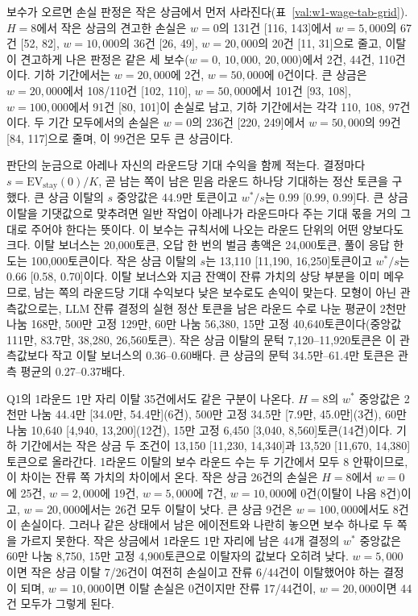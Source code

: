 보수가 오르면 손실 판정은 작은 상금에서 먼저 사라진다(표~\ref{val:w1-wage-tab-grid}). $H=8$에서 작은 상금의 견고한 손실은 $w=0$의 131건 [116, 143]에서 $w=5{,}000$의 67건 [52, 82], $w=10{,}000$의 36건 [26, 49], $w=20{,}000$의 20건 [11, 31]으로 줄고, 이탈이 견고하게 나은 판정은 같은 세 보수($w=0$, $10{,}000$, $20{,}000$)에서 2건, 44건, 110건이다. 기하 기간에서는 $w=20{,}000$에 2건, $w=50{,}000$에 0건이다. 큰 상금은 $w=20{,}000$에서 108/110건 [102, 110], $w=50{,}000$에서 101건 [93, 108], $w=100{,}000$에서 91건 [80, 101]이 손실로 남고, 기하 기간에서는 각각 110, 108, 97건이다. 두 기간 모두에서의 손실은 $w=0$의 236건 [220, 249]에서 $w=50{,}000$의 99건 [84, 117]으로 줄며, 이 99건은 모두 큰 상금이다.

판단의 눈금으로 아레나 자신의 라운드당 기대 수익을 함께 적는다. 결정마다 $s=\mathrm{EV}_{\mathrm{stay}}(0)/K$, 곧 남는 쪽이 남은 믿음 라운드 하나당 기대하는 정산 토큰을 구했다. 큰 상금 이탈의 $s$ 중앙값은 44.9만 토큰이고 $w^{*}/s$는 0.99 [0.99, 0.99]다. 큰 상금 이탈을 기댓값으로 맞추려면 일반 작업이 아레나가 라운드마다 주는 기대 몫을 거의 그대로 주어야 한다는 뜻이다. 이 보수는 규칙서에 나오는 라운드 단위의 어떤 양보다도 크다. 이탈 보너스는 20,000토큰, 오답 한 번의 벌금 총액은 24,000토큰, 풀이 응답 한도는 100,000토큰이다. 작은 상금 이탈의 $s$는 13,110 [11,190, 16,250]토큰이고 $w^{*}/s$는 0.66 [0.58, 0.70]이다. 이탈 보너스와 지금 잔액이 잔류 가치의 상당 부분을 이미 메우므로, 남는 쪽의 라운드당 기대 수익보다 낮은 보수로도 손익이 맞는다. 모형이 아닌 관측값으로는, LLM 잔류 결정의 실현 정산 토큰을 남은 라운드 수로 나눈 평균이 2천만 나눔 168만, 500만 고정 129만, 60만 나눔 56,380, 15만 고정 40,640토큰이다(중앙값 111만, 83.7만, 38,280, 26,560토큰). 작은 상금 이탈의 문턱 7,120--11,920토큰은 이 관측값보다 작고 이탈 보너스의 0.36--0.60배다. 큰 상금의 문턱 34.5만--61.4만 토큰은 관측 평균의 0.27--0.37배다.

Q1의 1라운드 1만 자리 이탈 35건에서도 같은 구분이 나온다. $H=8$의 $w^{*}$ 중앙값은 2천만 나눔 44.4만 [34.0만, 54.4만](6건), 500만 고정 34.5만 [7.9만, 45.0만](3건), 60만 나눔 10,640 [4,940, 13,200](12건), 15만 고정 6,450 [3,040, 8,560]토큰(14건)이다. 기하 기간에서는 작은 상금 두 조건이 13,150 [11,230, 14,340]과 13,520 [11,670, 14,380]토큰으로 올라간다. 1라운드 이탈의 보수 라운드 수는 두 기간에서 모두 8 안팎이므로, 이 차이는 잔류 쪽 가치의 차이에서 온다. 작은 상금 26건의 손실은 $H=8$에서 $w=0$에 25건, $w=2{,}000$에 19건, $w=5{,}000$에 7건, $w=10{,}000$에 0건(이탈이 나음 8건)이고, $w=20{,}000$에서는 26건 모두 이탈이 낫다. 큰 상금 9건은 $w=100{,}000$에서도 8건이 손실이다. 그러나 같은 상태에서 남은 에이전트와 나란히 놓으면 보수 하나로 두 쪽을 가르지 못한다. 작은 상금에서 1라운드 1만 자리에 남은 44개 결정의 $w^{*}$ 중앙값은 60만 나눔 8,750, 15만 고정 4,900토큰으로 이탈자의 값보다 오히려 낮다. $w=5{,}000$이면 작은 상금 이탈 7/26건이 여전히 손실이고 잔류 6/44건이 이탈했어야 하는 결정이 되며, $w=10{,}000$이면 이탈 손실은 0건이지만 잔류 17/44건이, $w=20{,}000$이면 44건 모두가 그렇게 된다.


